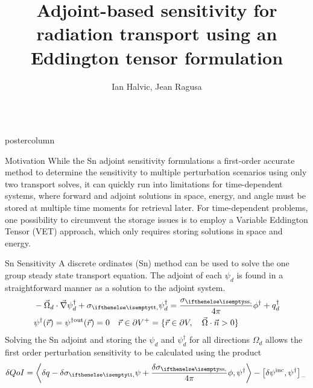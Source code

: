 \documentclass[xcolor={usenames,dvipsnames,svgnames,table}]{beamer}
\title[<short>]{Adjoint-based sensitivity for radiation transport using an Eddington tensor formulation}
\author[<short>]{Ian Halvic, Jean Ragusa}
\institute{Department of Nuclear Engineering, Texas A\&M University, College Station, TX, USA 77843}
\newcommand{\vr}{\vec{r}}
\newcommand{\vO}{\vec{\Omega}}
\newcommand{\bra}{\left\langle}
\newcommand{\ket}{\right\rangle}
\newcommand{\sbra}{\left[}
\newcommand{\sket}{\right]}
\newcommand{\bound}{\partial V}
\newcommand{\scalSource}{q}
\newcommand{\angResp}{q^\dag}
\newlength{\columnheight}
\begin{document}
\begin{frame}
	\begin{columns}

	\begin{column}{.33\textwidth}
		\begin{beamercolorbox}[center,wd=\textwidth]{postercolumn}
			\begin{minipage}[T]{0.95\textwidth} %
			\parbox[t][\columnheight]{\textwidth}{ %

			    \begin{block}{Motivation}
			    While the Sn adjoint sensitivity formulations a first-order accurate method to determine the sensitivity to multiple perturbation scenarios using only two transport solves, it can quickly run into limitations for time-dependent systems, where forward and adjoint solutions in space, energy, and angle must be stored at multiple time moments for retrieval later. For time-dependent problems, one possibility to circumvent the storage issues is to employ a Variable Eddington Tensor (VET) approach, which only requires
storing solutions in space and energy.
			    \end{block}
			    \vfill


			    \begin{block}{Sn Sensitivity}
A discrete ordinates (Sn) method can be used to solve the one group steady state transport equation. The adjoint of each $\psi_d$ is found in a straightforward manner as a solution to the adjoint system.			    
\begin{equation}
\label{snAdj}
\begin{split}
&- \vO_d \cdot \grad \psi^\dag_d + \sigt \psi^\dag_d = \frac{\sigs}{4 \pi} \phi^\dag + \angResp_d \\
&\psi^\dag(\vr) = \psi^{\dag \text{out}}(\vr)=0 \quad \vr \in \partial V^{+} = \{  \vr \in \bound , \quad \vO \cdot \vec{n} > 0 \}
\end{split}
\end{equation}
Solving the Sn adjoint and storing the $\psi_d$ and $\psi^\dag_d$ for all directions $\Omega_d$ allows the first order perturbation sensitivity to be calculated using the product
\begin{equation}
\label{snSens}
\delta QoI = \bra \delta \scalSource - \delta \sigt \psi + \frac{\delta\sigs}{4 \pi} \phi , \psi^\dag  \ket - \sbra \delta \psi^{\text{inc}}, \psi^\dag \sket_- \,
\end{equation}
			    \end{block}
			    \vfill




}
\end{minipage}
\end{beamercolorbox}
\end{column}
\end{columns}
\end{frame}
\end{document}
